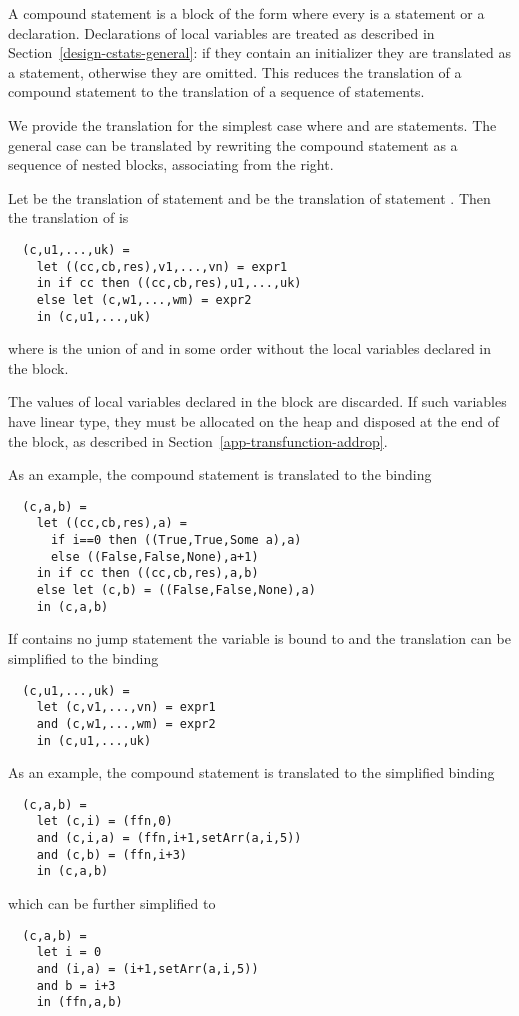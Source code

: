 A compound statement is a block of the form  where every  is a statement or a declaration.
Declarations of local variables are treated as described in Section~\ref{design-cstats-general}: if they contain an
initializer they are translated as a statement, otherwise they are omitted. This reduces the translation of a compound
statement to the translation of a sequence of statements.

We provide the translation for the simplest case  where  and  are statements.
The general case can be translated by rewriting the compound statement as a sequence of nested blocks, associating
from the right.

Let  be the translation of statement  and  
be the translation of statement . Then the translation of
 is
\begin{verbatim}
  (c,u1,...,uk) =
    let ((cc,cb,res),v1,...,vn) = expr1
    in if cc then ((cc,cb,res),u1,...,uk)
    else let (c,w1,...,wm) = expr2
    in (c,u1,...,uk)
\end{verbatim}
where  is the union of  and  in some order without the local variables 
declared in the block.

The values of local variables declared in the block are discarded. If such variables have linear type, they must
be allocated on the heap and disposed at the end of the block, as described in Section~\ref{app-transfunction-addrop}.

As an example, the compound statement  is translated to the binding
\begin{verbatim}
  (c,a,b) =
    let ((cc,cb,res),a) = 
      if i==0 then ((True,True,Some a),a)
      else ((False,False,None),a+1)
    in if cc then ((cc,cb,res),a,b)
    else let (c,b) = ((False,False,None),a)
    in (c,a,b)
\end{verbatim}

If  contains no jump statement the variable  is bound to  and the translation
can be simplified to the binding
\begin{verbatim}
  (c,u1,...,uk) =
    let (c,v1,...,vn) = expr1
    and (c,w1,...,wm) = expr2
    in (c,u1,...,uk)
\end{verbatim}

As an example, the compound statement  is translated to the 
simplified binding
\begin{verbatim}
  (c,a,b) =
    let (c,i) = (ffn,0)
    and (c,i,a) = (ffn,i+1,setArr(a,i,5))
    and (c,b) = (ffn,i+3)
    in (c,a,b)
\end{verbatim}
which can be further simplified to
\begin{verbatim}
  (c,a,b) =
    let i = 0
    and (i,a) = (i+1,setArr(a,i,5))
    and b = i+3
    in (ffn,a,b)
\end{verbatim}

